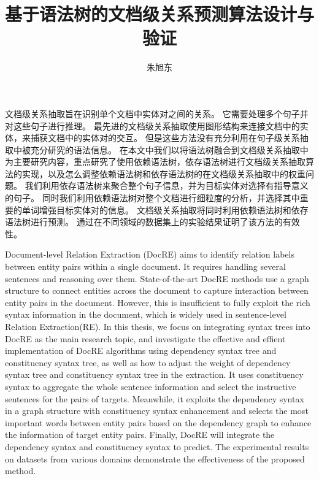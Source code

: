 \documentclass[bachelor]{thesis-uestc}
\title{基于语法树的文档级关系预测算法设计与验证}{Design and Verification of Document-level Relation Extraction Algorithm Based on Syntax Tree}
\author{朱旭东}{Xudong Zhu}
\begin{document}
\makecover

\begin{chineseabstract}
    文档级关系抽取旨在识别单个文档中实体对之间的关系。
    它需要处理多个句子并对这些句子进行推理。
    最先进的文档级关系抽取使用图形结构来连接文档中的实体，来捕获文档中的实体对的交互。
    但是这些方法没有充分利用在句子级关系抽取中被充分研究的语法信息。
    在本文中我们以将语法树融合到文档级关系抽取中为主要研究内容，重点研究了使用依赖语法树，依存语法树进行文档级关系抽取算法的实现，以及怎么调整依赖语法树和依存语法树的在文档级关系抽取中的权重问题。
    我们利用依存语法树来聚合整个句子信息，并为目标实体对选择有指导意义的句子。
    同时我们利用依赖语法树对整个文档进行细粒度的分析，并选择其中重要的单词增强目标实体对的信息。
    文档级关系抽取将同时利用依赖语法树和依存语法树进行预测。
    通过在不同领域的数据集上的实验结果证明了该方法的有效性。


\end{chineseabstract}

\begin{englishabstract}
    Document-level Relation Extraction (DocRE) aims to identify relation labels between entity pairs within a single document.
    It requires handling several sentences and reasoning over them.
    State-of-the-art DocRE methods use a graph structure to connect entities across the document to capture interaction between entity pairs in the document.
    However, this is insufficient to fully exploit the rich syntax information in the document, which is widely used in sentence-level Relation Extraction(RE).
    In this thesis, we focus on integrating syntax trees into DocRE as the main research topic, and investigate the effective and effient implementation of DocRE algorithms using dependency syntax tree and constituency syntax tree, as well as how to adjust the weight of dependency syntax tree and constituency syntax tree in the extraction.
    It uses constituency syntax to aggregate the whole sentence information and select the instructive sentences for the pairs of targets.
    Meanwhile, it exploits the dependency syntax in a graph structure with constituency syntax enhancement and selects the most important words between entity pairs based on the dependency graph to enhance the information of target entity pairs.
    Finally, DocRE will integrate the dependency syntax and constituency syntax to predict.
    The experimental results on datasets from various domains demonstrate the effectiveness of the proposed method.


\end{englishabstract}
\end{document}
